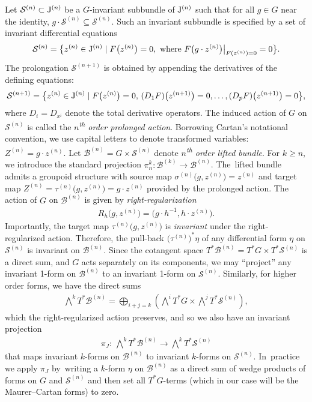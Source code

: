 \documentclass[10pt,a4paper]{amsart}
\numberwithin{equation}{section}
\newcommand{\B}{\mathcal{B}}
\newcommand{\J}{{\rm J}}
\newcommand{\n}{^{(n)}}
\newcommand{\mS}{\mathcal{S}}
\begin{document}
Let $\mS\n \subset \J\n$ be a $G$-invariant subbundle of $\J\n$ such that for all $g \in G$ near the identity, $g\cdot \mS\n \subseteq \mS\n$. Such an invariant subbundle is specified by a set of invariant differential equations
%
\begin{gather}\label{eq:submanifold}
\mS\n = \big\{ z\n \in \J\n\mid F\big(z\n\big)=0,\ \text{where}\ F\big(g\cdot z\n\big)\big|_{F(z\n)=0} = 0\big\}.
\end{gather}
%
The prolongation $\mS^{(n+1)}$ is obtained by appending the derivatives of the defining equations:
\begin{gather*}
\mS^{(n+1)} = \big\{z\n \in \J\n\mid F\big(z\n\big)=0,\, (D_1 F)\big(z^{(n+1)}\big)=0, \dots, (D_pF)\big(z^{(n+1)}\big)=0\big\},
\end{gather*}
where $D_i = D_{x^i}$ denote the total derivative operators. The induced action of $G$ on $\mS\n$ is called the \emph{$n$\textsuperscript{th} order prolonged action}. Borrowing Cartan's notational convention, we use capital letters to denote transformed variables: $Z\n = g\cdot z\n$. Let $\B\n = G\times \mS\n$ denote \emph{$n$\textsuperscript{th} order lifted bundle}. For $k\geq n$, we introduce the standard projection $\pi^k_n\colon \B^{(k)}\to \B\n$. The~lif\-ted bundle admits a groupoid structure with source map $\sigma\n\big(g,z\n\big)=z\n$ and target map $Z\n = \tau\n\big(g,z\n\big) = g\cdot z\n$ provided by the prolonged action. The action of $G$ on $\B\n$ is given by \emph{right-regularization}
\begin{gather*}
R_h\big(g,z\n\big) = \big(g\cdot h^{-1},h\cdot z\n\big).
\end{gather*}
Importantly, the target map $\tau\n\big(g,z\n\big)$ is \emph{invariant} under the right-regularized action. Therefore, the pull-back $\big(\tau\n\big)^*\eta$ of any differential form $\eta$ on $\mS\n$ is invariant on $\B\n$. Since the cotangent space $T^*\B\n=T^*G\times T^*\mS\n$ is a direct sum, and $G$ acts separately on its components, we may ``project'' any invariant 1-form on $\B\n$ to an invariant 1-form on $\mS\n$. Similarly, for higher order forms, we have the direct sums
\begin{gather*}
\bigwedge\nolimits^kT^*\B\n=\bigoplus_{i+j=k}\left(\bigwedge\nolimits^iT^*G \times \bigwedge\nolimits^jT^*\mS\n\right)\!,
\end{gather*}
which the right-regularized action preserves, and so we also have an invariant projection
\begin{gather*}
\pi_J\colon\ \bigwedge\nolimits^kT^*\B\n \to \bigwedge\nolimits^kT^*\mS\n
\end{gather*}
that maps invariant $k$-forms on $\B\n$ to invariant $k$-forms on $\mS\n$. In~practice we apply $\pi_J$ by~writing a $k$-form $\eta$ on $\B\n$ as a direct sum of wedge products of forms on $G$ and $\mS\n$ and then set all $T^*G$-terms (which in our case will be the Maurer--Cartan forms) to zero.
\end{document}
